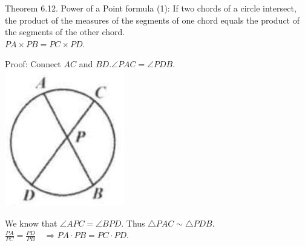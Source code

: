 \documentclass[10pt]{article}
\begin{document}
Theorem 6.12. Power of a Point formula (1): If two chords of a circle intersect, the product of the measures of the segments of one chord equals the product of the segments of the other chord.\\
\(P A \times P B=P C \times P D\).

Proof:
Connect \(A C\) and \(B D . \angle P A C=\angle P D B\).\\
\includegraphics[max width=\textwidth, center]{2025_04_17_97bc1f7e44d93c271a88g-192}

We know that \(\angle A P C=\angle B P D\). Thus \(\triangle P A C \sim \triangle P D B\).\\
\(\frac{P A}{P C}=\frac{P D}{P B} \quad \Rightarrow P A \cdot P B=P C \cdot P D\).
\end{document}

